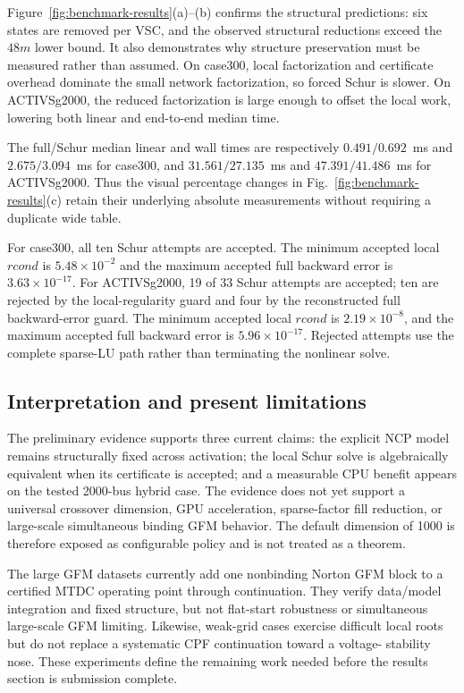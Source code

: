 Figure~\ref{fig:benchmark-results}(a)--(b) confirms the structural predictions: six
states are removed per VSC, and the observed structural reductions exceed the
$48m$ lower bound. It also demonstrates why structure preservation must be
measured rather than assumed. On case300, local factorization and certificate
overhead dominate the small network factorization, so forced Schur is slower.
On ACTIVSg2000, the reduced factorization is large enough to offset the local
work, lowering both linear and end-to-end median time.

The full/Schur median linear and wall times are respectively
$0.491/0.692$~ms and $2.675/3.094$~ms for case300, and
$31.561/27.135$~ms and $47.391/41.486$~ms for ACTIVSg2000. Thus the
visual percentage changes in Fig.~\ref{fig:benchmark-results}(c) retain their
underlying absolute measurements without requiring a duplicate wide table.

For case300, all ten Schur attempts are accepted. The minimum accepted local
$rcond$ is $5.48\times10^{-2}$ and the maximum accepted full backward error is
$3.63\times10^{-17}$. For ACTIVSg2000, 19 of 33 Schur attempts are accepted;
ten are rejected by the local-regularity guard and four by the reconstructed
full backward-error guard. The minimum accepted local $rcond$ is
$2.19\times10^{-8}$, and the maximum accepted full backward error is
$5.96\times10^{-17}$. Rejected attempts use the complete sparse-LU path rather
than terminating the nonlinear solve.

\subsection{Interpretation and present limitations}

The preliminary evidence supports three current claims: the explicit NCP
model remains structurally fixed across activation; the local Schur solve is
algebraically equivalent when its certificate is accepted; and a measurable
CPU benefit appears on the tested 2000-bus hybrid case. The evidence does not
yet support a universal crossover dimension, GPU acceleration, sparse-factor
fill reduction, or large-scale simultaneous binding GFM behavior. The default
dimension of 1000 is therefore exposed as configurable policy and is not
treated as a theorem.

The large GFM datasets currently add one nonbinding Norton GFM block to a
certified MTDC operating point through continuation. They verify data/model
integration and fixed structure, but not flat-start robustness or simultaneous
large-scale GFM limiting. Likewise, weak-grid cases exercise difficult local
roots but do not replace a systematic CPF continuation toward a voltage-
stability nose. These experiments define the remaining work needed before the
results section is submission complete.
